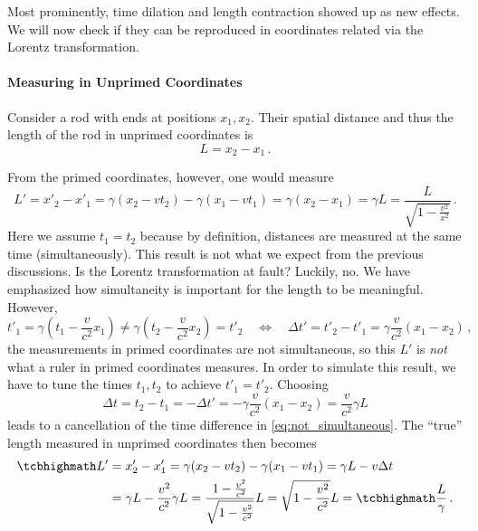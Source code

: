 Most prominently, time dilation and length contraction showed up as new effects. We will now check if they can be reproduced in coordinates related via the Lorentz transformation.



			\paragraph{Measuring in Unprimed Coordinates}
Consider a rod with ends at positions $x_1, x_2$. Their spatial distance and thus the length of the rod in unprimed coordinates is
\begin{equation*}
	L = x_2 - x_1 \, .
\end{equation*}

From the primed coordinates, however, one would measure
\begin{equation*}
	L' = x'_2 - x'_1 = \gamma (x_2 - v t_2) - \gamma (x_1 - v t_1) = \gamma (x_2 - x_1) = \gamma L = \frac{L}{\sqrt{1 - \frac{v^2}{x^2}}} \, .
\end{equation*}
Here we assume $t_1 = t_2$ because by definition, distances are measured at the same time (simultaneously). This result is not what we expect from the previous discussions. Is the Lorentz transformation at fault? Luckily, no. We have emphasized how simultaneity is important for the length to be meaningful. However,
\begin{equation}\label{eq:not_simultaneous}
	t'_1 = \gamma (t_1 - \frac{v}{c^2} x_1) \neq \gamma (t_2 - \frac{v}{c^2} x_2) = t'_2
	\quad \Leftrightarrow \quad
	\Delta t' = t'_2 - t'_1 = \gamma \frac{v}{c^2} (x_1 - x_2)
	\, ,
\end{equation}
the measurements in primed coordinates are not simultaneous, so this $L'$ is \emph{not} what a ruler in primed coordinates measures. In order to simulate this result, we have to tune the times $t_1, t_2$ to achieve $t'_1 = t'_2$. Choosing
\begin{equation}
	\Delta t = t_2 - t_1 = - \Delta t' = - \gamma \frac{v}{c^2} (x_1 - x_2) = \frac{v}{c^2} \gamma L
\end{equation}
leads to a cancellation of the time difference in \eqref{eq:not_simultaneous}. The \enquote{true} length measured in unprimed coordinates then becomes
\begin{equation}
	\begin{split}
	\eqbox{L'} &= x'_2 - x'_1 = \gamma (x_2 - v t_2) - \gamma (x_1 - v t_1) = \gamma L - v \Delta t
	\\
	&= \gamma L - \frac{v^2}{c^2} \gamma L = \frac{1 - \frac{v^2}{c^2}}{\sqrt{1 - \frac{v^2}{c^2}}} L = \sqrt{1 - \frac{v^2}{c^2}} L = \eqbox{\frac{L}{\gamma}} \, .
	\end{split}
\end{equation}
